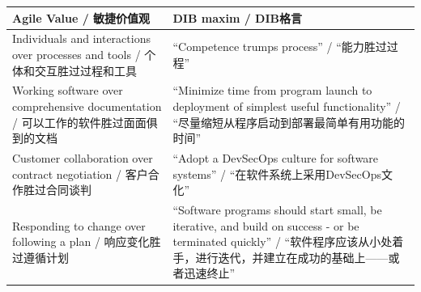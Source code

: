 \documentclass[UTF8, oneside]{ctexbook}
\begin{document}
\begin{paracol}{2}
  \begin{leftcolumn*}
    \begin{center}
      \begin{tabular}[b]{|p{.95\linewidth}|p{.95\linewidth}|}
        \hline
        \textbf{Agile Value / 敏捷价值观} & \textbf{DIB maxim / DIB格言}\\
        \hline
        Individuals and interactions over processes and tools / 个体和交互胜过过程和工具 & “Competence trumps process” / “能力胜过过程”\\
        \hline
        Working software over comprehensive documentation / 可以工作的软件胜过面面俱到的文档 & “Minimize time from program launch to deployment of simplest useful functionality” / “尽量缩短从程序启动到部署最简单有用功能的时间”\\
        \hline
        Customer collaboration over contract negotiation / 客户合作胜过合同谈判 & “Adopt a DevSecOps culture for software systems” / “在软件系统上采用DevSecOps文化”\\
        \hline
        Responding to change over following a plan / 响应变化胜过遵循计划 & “Software programs should start small, be iterative, and build on success - or be terminated quickly” / “软件程序应该从小处着手，进行迭代，并建立在成功的基础上——或者迅速终止”\\
        \hline
      \end{tabular}
    \end{center}
  \end{leftcolumn*}
\end{paracol}
\end{document}
